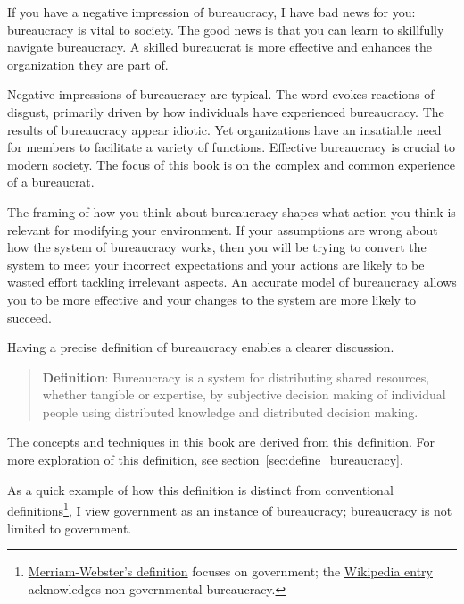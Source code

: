 

If you have a negative impression of bureaucracy, I have bad news for you: bureaucracy is vital to society. The good news is that you can learn to skillfully navigate bureaucracy. A skilled bureaucrat is more effective and enhances the organization they are part of.

Negative impressions of bureaucracy are typical. The word 
evokes reactions of disgust, primarily driven by how individuals have experienced bureaucracy. The results of bureaucracy appear idiotic. Yet organizations have an insatiable need for members to facilitate a variety of functions. Effective bureaucracy is crucial to modern society. The focus of this book is on the complex and common experience of a bureaucrat. 

The framing of how you think about bureaucracy shapes what action you think is relevant for modifying your environment. 
If your assumptions are wrong about how the system of bureaucracy works, then you will be trying to convert the system to meet your incorrect expectations and your actions are likely to be wasted effort tackling irrelevant aspects. 
An accurate model of bureaucracy allows you to be more effective and your changes to the system are more likely to succeed. 

Having a precise definition of bureaucracy enables a clearer discussion. 
\begin{quote}
\textbf{Definition}: Bureaucracy is a system for distributing shared resources, whether tangible or expertise, by subjective decision making of individual people using distributed knowledge and distributed decision making. 
\end{quote}

The concepts and techniques in this book are derived from this definition. For more exploration of this definition, see section~\ref{sec:define_bureaucracy}.

As a quick example of how this definition is distinct from conventional definitions\footnote{\href{https://www.merriam-webster.com/dictionary/bureaucracy}{Merriam-Webster's definition} focuses on government; the \href{https://www.merriam-webster.com/dictionary/bureaucracy}{Wikipedia entry} acknowledges non-governmental bureaucracy.}, I view government as an instance of bureaucracy; bureaucracy is not limited to government. 

